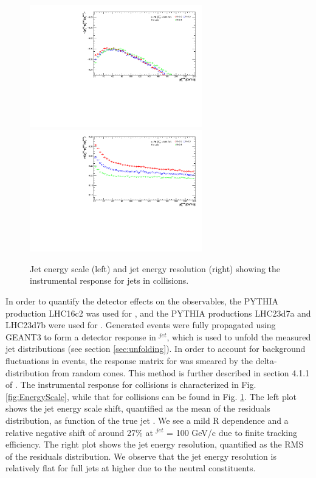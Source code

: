 \begin{figure}[h!]
    \centering
    \begin{multicols}{2}
            \includegraphics[width=7.5cm]{figures/pPbFigures/EnergyScale/EnergyScaleMean.pdf}
        \vfill\null 
        \columnbreak
            \includegraphics[width=7.5cm]{figures/pPbFigures/EnergyScale/EnergyScaleWidth.pdf}
        \vfill\null
    \end{multicols}
    \caption{Jet energy scale (left) and jet energy resolution (right) showing the instrumental response for jets in \pPb collisions.}
    \label{fig:EnergyScalepPb}
\end{figure}

In order to quantify the detector effects on the observables, the PYTHIA production LHC16c2 was used for \pp, and the PYTHIA productions LHC23d7a and LHC23d7b were used for \pPb. Generated events were fully propagated using GEANT3 to form a detector response in \pT$^{jet}$, which is used to unfold the measured jet distributions (see section \ref{sec:unfolding}). In order to account for background fluctuations in \pPb events, the response matrix for \pPb was smeared by the delta-\pT distribution from random cones. This method is further described in section 4.1.1 of \cite{anaNoteHHassan}. The instrumental response for \pp collisions is characterized in Fig. \ref{fig:EnergyScale}, while that for \pPb collisions can be found in Fig. \ref{fig:EnergyScalepPb}. The left plot shows the jet energy scale shift, quantified as the mean of the residuals distribution, as function of the true jet \pT. We see a mild R dependence and a relative negative shift of around 27\% at \pT$^{jet}$ = 100 GeV/c due to finite tracking efficiency. The right plot shows the jet energy resolution, quantified as the RMS of the residuals distribution. We observe that the jet energy resolution is relatively flat for full jets at higher \pT due to the neutral constituents.

